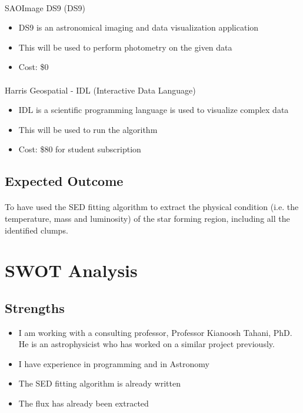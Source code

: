 \documentclass{article}
\begin{document}
\paragraph{}
SAOImage DS9 (DS9)

\begin{itemize}
\item DS9 is an astronomical imaging and data visualization application
\item This will be used to perform photometry on the given data
\item Cost: \$0
\end{itemize}

\paragraph{}
Harris Geospatial - IDL (Interactive Data Language)

\begin{itemize}
\item IDL is a scientific programming language is used to visualize complex data
\item This will be used to run the algorithm
\item Cost: \$80 for student subscription
\end{itemize}

\subsection{Expected Outcome}
\paragraph{}
To have used the SED fitting algorithm to extract the physical condition (i.e. the temperature, mass and luminosity) of the star forming region, including all the identified clumps.  

\section{SWOT Analysis}

\subsection{Strengths}

\begin{itemize}
\item I am working with a consulting professor, Professor Kianoosh Tahani, PhD. He is an astrophysicist who has worked on a similar project previously.
\item I have experience in programming and in Astronomy
\item The SED fitting algorithm is already written 
\item The flux has already been extracted
\end{itemize}
\end{document}
